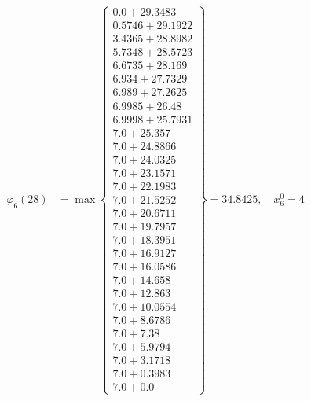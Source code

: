 \documentclass{article}
\begin{document}
\begin{align*}
  
\varphi_{6}(28) &= \max \left\{ \begin{array}{c}
0.0 + 29.3483 \\
 0.5746 + 29.1922 \\
 3.4365 + 28.8982 \\
 5.7348 + 28.5723 \\
 6.6735 + 28.169 \\
 6.934 + 27.7329 \\
 6.989 + 27.2625 \\
 6.9985 + 26.48 \\
 6.9998 + 25.7931 \\
 7.0 + 25.357 \\
 7.0 + 24.8866 \\
 7.0 + 24.0325 \\
 7.0 + 23.1571 \\
 7.0 + 22.1983 \\
 7.0 + 21.5252 \\
 7.0 + 20.6711 \\
 7.0 + 19.7957 \\
 7.0 + 18.3951 \\
 7.0 + 16.9127 \\
 7.0 + 16.0586 \\
 7.0 + 14.658 \\
 7.0 + 12.863 \\
 7.0 + 10.0554 \\
 7.0 + 8.6786 \\
 7.0 + 7.38 \\
 7.0 + 5.9794 \\
 7.0 + 3.1718 \\
 7.0 + 0.3983 \\
 7.0 + 0.0
\end{array} \right\}=34.8425,\quad x_{6}^0=4\\
  
  
  

\end{align*}
\end{document}
